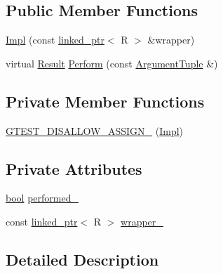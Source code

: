 \subsection*{Public Member Functions}
\begin{DoxyCompactItemize}
\item 
\hyperlink{classtesting_1_1internal_1_1ReturnAction_1_1Impl_3_01ByMoveWrapper_3_01R___01_4_00_01F_01_4_a4f6ed0465b3f7b116142025c7f7ec3d2}{Impl} (const \hyperlink{classtesting_1_1internal_1_1linked__ptr}{linked\+\_\+ptr}$<$ R $>$ \&wrapper)
\item 
virtual \hyperlink{classtesting_1_1ActionInterface_a7477de2fe3e4e01c59db698203acaee7}{Result} \hyperlink{classtesting_1_1internal_1_1ReturnAction_1_1Impl_3_01ByMoveWrapper_3_01R___01_4_00_01F_01_4_a4f6e45f593abffb7a8b26cebfc4a0262}{Perform} (const \hyperlink{classtesting_1_1ActionInterface_af72720d864da4d606629e83edc003511}{Argument\+Tuple} \&)
\end{DoxyCompactItemize}
\subsection*{Private Member Functions}
\begin{DoxyCompactItemize}
\item 
\hyperlink{classtesting_1_1internal_1_1ReturnAction_1_1Impl_3_01ByMoveWrapper_3_01R___01_4_00_01F_01_4_a989ee18a52a8bacfac5c9b6bfe82cf53}{G\+T\+E\+S\+T\+\_\+\+D\+I\+S\+A\+L\+L\+O\+W\+\_\+\+A\+S\+S\+I\+G\+N\+\_\+} (\hyperlink{classtesting_1_1internal_1_1ReturnAction_1_1Impl}{Impl})
\end{DoxyCompactItemize}
\subsection*{Private Attributes}
\begin{DoxyCompactItemize}
\item 
\hyperlink{classbool}{bool} \hyperlink{classtesting_1_1internal_1_1ReturnAction_1_1Impl_3_01ByMoveWrapper_3_01R___01_4_00_01F_01_4_adb9db786f4a87a4a8a055ddc840f9d77}{performed\+\_\+}
\item 
const \hyperlink{classtesting_1_1internal_1_1linked__ptr}{linked\+\_\+ptr}$<$ R $>$ \hyperlink{classtesting_1_1internal_1_1ReturnAction_1_1Impl_3_01ByMoveWrapper_3_01R___01_4_00_01F_01_4_a8ff130e32f8b90238cdbf7d62fe99de1}{wrapper\+\_\+}
\end{DoxyCompactItemize}


\subsection{Detailed Description}

